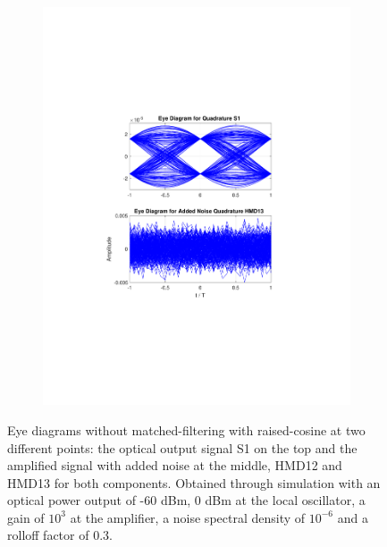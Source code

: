 \begin{figure}[H]
\begin{subfigure}{.45\textwidth}
		\includegraphics[clip, trim=5cm 4cm 5cm 4cm, width=\textwidth]{./sdf/m_qam_system/figures/eyes/q_n_nmf_60_60_rc_03.pdf}
	\end{subfigure}
	
	\caption{Eye diagrams without matched-filtering with raised-cosine at
		two different points: the optical output signal S1 on the top and the amplified
		signal with added noise at the middle, HMD12 and HMD13 for both components.
		Obtained through simulation with an optical power output of -60 dBm, 0 dBm at
		the local oscillator, a gain of $10^3$ at the amplifier, a noise spectral
		density of $10^{-6}$ and a rolloff factor of 0.3.\label{fig:eyes_n_rrc_60_03}}
	
\end{figure}

